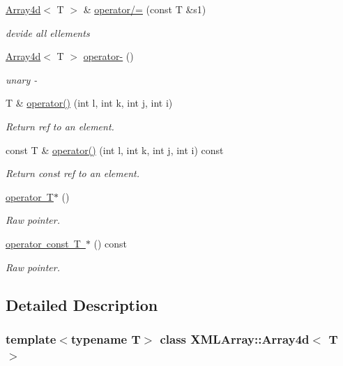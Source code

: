 \begin{DoxyCompactItemize}
\mbox{\hyperlink{classXMLArray_1_1Array4d}{Array4d}}$<$ T $>$ \& \mbox{\hyperlink{classXMLArray_1_1Array4d_a22b262f7b7905313ae8e21d5e2d717a7}{operator/=}} (const T \&s1)
\begin{DoxyCompactList}\small\item\em devide all ellements \end{DoxyCompactList}\item 
\mbox{\hyperlink{classXMLArray_1_1Array4d}{Array4d}}$<$ T $>$ \mbox{\hyperlink{classXMLArray_1_1Array4d_a33d29c88630265c416d8e8a7355f166e}{operator-\/}} ()
\begin{DoxyCompactList}\small\item\em unary -\/ \end{DoxyCompactList}\item 
T \& \mbox{\hyperlink{classXMLArray_1_1Array4d_aed3f4e517b15358348150e8212189b60}{operator()}} (int l, int k, int j, int i)
\begin{DoxyCompactList}\small\item\em Return ref to an element. \end{DoxyCompactList}\item 
const T \& \mbox{\hyperlink{classXMLArray_1_1Array4d_ae9076800aed9ec98d434d01fcaf4ba3a}{operator()}} (int l, int k, int j, int i) const
\begin{DoxyCompactList}\small\item\em Return const ref to an element. \end{DoxyCompactList}\item 
\mbox{\hyperlink{classXMLArray_1_1Array4d_a25e918248c9191d04788cce2e0116bf1}{operator T$\ast$}} ()
\begin{DoxyCompactList}\small\item\em Raw pointer. \end{DoxyCompactList}\item 
\mbox{\hyperlink{classXMLArray_1_1Array4d_abe07755f692bf1df5acf5b8b9cd266cb}{operator const T $\ast$}} () const
\begin{DoxyCompactList}\small\item\em Raw pointer. \end{DoxyCompactList}\end{DoxyCompactItemize}


\subsection{Detailed Description}
\subsubsection*{template$<$typename T$>$\newline
class X\+M\+L\+Array\+::\+Array4d$<$ T $>$}

